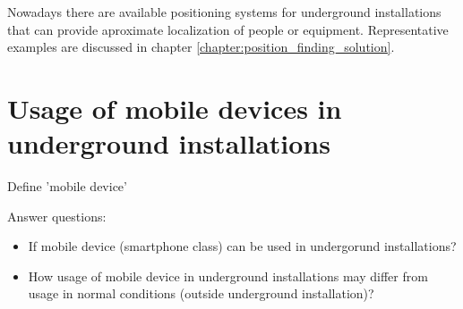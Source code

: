 \documentclass[../main.tex]{subfiles}
\begin{document}

Nowadays there are available positioning systems for underground installations that can provide aproximate localization of people or equipment. Representative examples are discussed in chapter \ref{chapter:position_finding_solution}.


\section{Usage of mobile devices in underground installations}
Define 'mobile device'

Answer questions:
\begin{itemize}
	\item If mobile device (smartphone class) can be used in undergorund installations?
	\item How usage of mobile device in underground installations may differ from usage in normal conditions (outside underground installation)?
\end{itemize}
\end{document}
